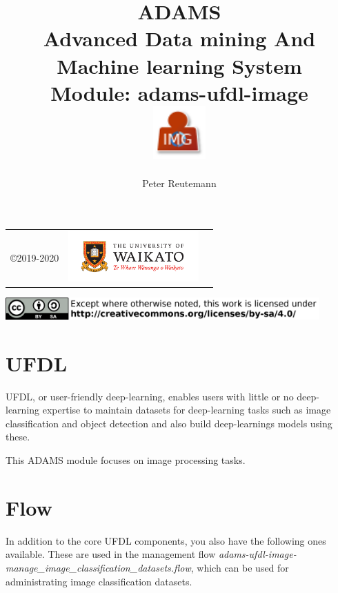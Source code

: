 \documentclass[a4paper]{book}
\title{
  \textbf{ADAMS} \\
  {\Large \textbf{A}dvanced \textbf{D}ata mining \textbf{A}nd \textbf{M}achine
  learning \textbf{S}ystem} \\
  {\Large Module: adams-ufdl-image} \\
  \vspace{1cm}
  \includegraphics[width=2cm]{images/ufdl-image-module.png} \\
}
\author{
  Peter Reutemann
}
\begin{document}
\begin{titlepage}
\maketitle

\thispagestyle{empty}
\center
\begin{table}[b]
	\begin{tabular}{c l l}
		\parbox[c][2cm]{2cm}{\copyright 2019-2020} &
		\parbox[c][2cm]{5cm}{\includegraphics[width=5cm]{images/coat_of_arms.pdf}} \\
	\end{tabular}
	\includegraphics[width=12cm]{images/cc.png} \\
\end{table}

\end{titlepage}

\tableofcontents

\chapter{UFDL}
UFDL, or user-friendly deep-learning, enables users with little or no deep-learning
expertise to maintain datasets for deep-learning tasks such as image classification
and object detection and also build deep-learnings models using these.

This ADAMS module focuses on image processing tasks.

\chapter{Flow}

In addition to the core UFDL components, you also have the following ones available.
These are used in the management flow \textit{adams-ufdl-image-manage\_image\_classification\_datasets.flow},
which can be used for administrating image classification datasets.
\end{document}
